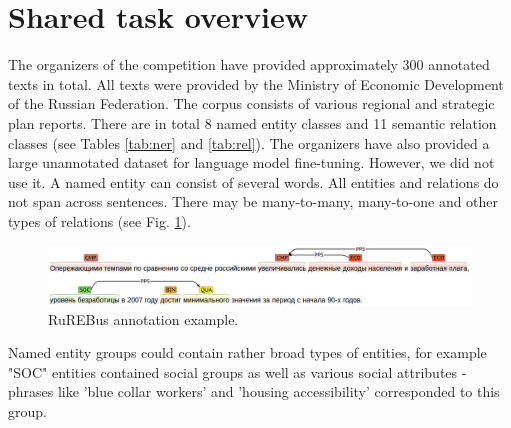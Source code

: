 \documentclass{dialogue}
\begin{document}
	\section{Shared task overview}
	The organizers of the competition have provided approximately 300 annotated texts in total. All texts were provided by the Ministry of Economic Development of the Russian Federation. The corpus consists of various regional and strategic plan reports. There are in total 8 named entity classes and 11 semantic relation classes (see Tables \ref{tab:ner} and \ref{tab:rel}). The organizers have also provided a large unannotated dataset for language model fine-tuning. However, we did not use it. A named entity can consist of several words. All entities and relations do not span across sentences. There may be many-to-many, many-to-one and other types of relations (see Fig. \ref{fig:brat}).
	
	\begin{figure}[thb]
		\centering
		\includegraphics[scale=0.4]{pics/brat}
		\caption{RuREBus annotation example.}
		\label{fig:brat}
	\end{figure}
	
	
	Named entity groups could contain rather broad types of entities, for example "SOC" entities contained social groups as well as various social attributes - phrases like 'blue collar workers' and 'housing accessibility' corresponded to this group.
	
\end{document}
